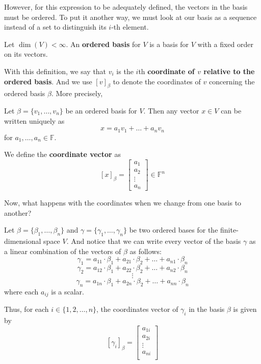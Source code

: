 However, for this expression to be adequately defined, the vectors in the basis must be ordered. To put it another way, we must look at our basis as a sequence instead of a set to distinguish its $i$-th element.

\begin{definition}
	Let $\dim(V) < \infty$. An \textbf{ordered basis} for $V$ is a basis for $V$ with a fixed order on its vectors. 
\end{definition}

With this definition, we say that $v_i$ is the $i$th \textbf{coordinate of $v$ relative to the ordered basis}. And we use $[ v ]_\beta$ to denote the coordinates of $v$ concerning the ordered basis $\beta$. More precisely,

\begin{definition}[Coordinates]
	Let $\beta = \{ v_1, \ldots, v_n \}$ be an ordered basis for $V$. Then any vector $x \in V$ can be written uniquely as
	\[
		x = a_1 v_1 + \ldots + a_n v_n
	\]
	for $a_1, \ldots, a_n \in \mathbb{F}$. 

	We define the \textbf{coordinate vector} as 
	\[
		[x]_\beta = \left[ \begin{matrix}
			a_1 \\
			a_2 \\
			\vdots \\
			a_n
			\end{matrix}\right] \in \mathbb{F}^n
	\]
\end{definition}

Now, what happens with the coordinates when we change from one basis to another?

Let $\beta = \{ \beta_1, \ldots, \beta_n \}$ and $\gamma = \{ \gamma_1, \ldots, \gamma_n \}$ be two ordered bases for the finite-dimensional space $V$. And notice that we can write every vector of the basis $\gamma$ as a linear combination of the vectors of $\beta$ as follows:
\[ \gamma_1 = a_{11}\cdot \beta_1 + a_{21}\cdot \beta_2 + \ldots + a_{n1}\cdot \beta_n \]
\[ \gamma_2 = a_{12}\cdot \beta_1 + a_{22}\cdot \beta_2 + \ldots + a_{n2}\cdot \beta_n \]
\[ \vdots \]
\[ \gamma_n = a_{1n}\cdot \beta_1 + a_{2n}\cdot \beta_2 + \ldots + a_{nn}\cdot \beta_n \]
where each $a_{ij}$ is a scalar.

Thus, for each $i \in \{1, 2, \ldots, n \}$, the coordinates vector of $\gamma_i$ in the basis $\beta$ is given by
\[
	[\gamma_i]_\beta =
	\begin{bmatrix} 
	a_{1i} \\
	a_{2i} \\
	\vdots \\
	a_{ni} \\
	\end{bmatrix}
\]

